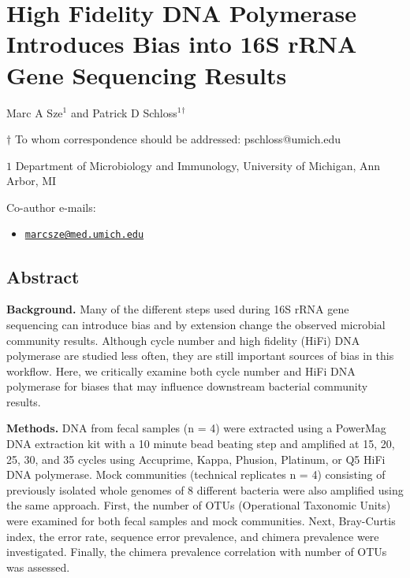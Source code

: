 \documentclass[12pt,]{article}
\title{}
\author{}
\date{}
\providecommand{\tightlist}{%
  \setlength{\itemsep}{0pt}\setlength{\parskip}{0pt}}
\begin{document}
\section{High Fidelity DNA Polymerase Introduces Bias into 16S rRNA Gene
Sequencing
Results}\label{high-fidelity-dna-polymerase-introduces-bias-into-16s-rrna-gene-sequencing-results}

\begin{center}
\vspace{25mm}

Marc A Sze${^1}$ and Patrick D Schloss${^1}$${^\dagger}$

\vspace{20mm}

$\dagger$ To whom correspondence should be addressed: pschloss@umich.edu

$1$ Department of Microbiology and Immunology, University of Michigan, Ann Arbor, MI




\end{center}

Co-author e-mails:

\begin{itemize}
\tightlist
\item
  \href{mailto:marcsze@med.umich.edu}{\nolinkurl{marcsze@med.umich.edu}}
\end{itemize}

\newpage

\linenumbers

\subsection{Abstract}\label{abstract}

\textbf{Background.} Many of the different steps used during 16S rRNA
gene sequencing can introduce bias and by extension change the observed
microbial community results. Although cycle number and high fidelity
(HiFi) DNA polymerase are studied less often, they are still important
sources of bias in this workflow. Here, we critically examine both cycle
number and HiFi DNA polymerase for biases that may influence downstream
bacterial community results.

\textbf{Methods.} DNA from fecal samples (n = 4) were extracted using a
PowerMag DNA extraction kit with a 10 minute bead beating step and
amplified at 15, 20, 25, 30, and 35 cycles using Accuprime, Kappa,
Phusion, Platinum, or Q5 HiFi DNA polymerase. Mock communities
(technical replicates n = 4) consisting of previously isolated whole
genomes of 8 different bacteria were also amplified using the same
approach. First, the number of OTUs (Operational Taxonomic Units) were
examined for both fecal samples and mock communities. Next, Bray-Curtis
index, the error rate, sequence error prevalence, and chimera prevalence
were investigated. Finally, the chimera prevalence correlation with
number of OTUs was assessed.
\end{document}
